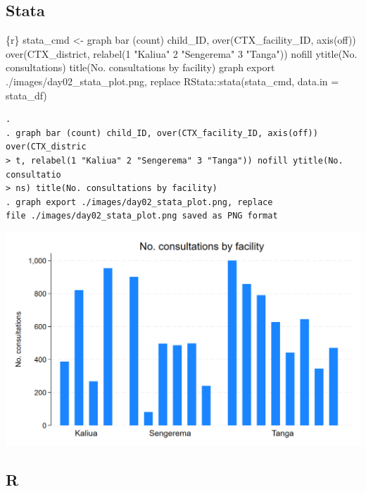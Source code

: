 \documentclass[
  letterpaper,
  DIV=11,
  numbers=noendperiod,
  oneside]{scrreprt}
\newenvironment{Shaded}{\begin{snugshade}}{\end{snugshade}}
\newcommand{\AttributeTok}[1]{\textcolor[rgb]{0.40,0.45,0.13}{#1}}
\newcommand{\FunctionTok}[1]{\textcolor[rgb]{0.28,0.35,0.67}{#1}}
\newcommand{\InformationTok}[1]{\textcolor[rgb]{0.37,0.37,0.37}{#1}}
\newcommand{\NormalTok}[1]{\textcolor[rgb]{0.00,0.23,0.31}{#1}}
\newcommand{\OtherTok}[1]{\textcolor[rgb]{0.00,0.23,0.31}{#1}}
\newcommand{\SpecialCharTok}[1]{\textcolor[rgb]{0.37,0.37,0.37}{#1}}
\newcommand{\StringTok}[1]{\textcolor[rgb]{0.13,0.47,0.30}{#1}}
\begin{document}
\subsection{Stata}

\begin{Shaded}
\begin{Highlighting}[]
\InformationTok{\textasciigrave{}\textasciigrave{}\textasciigrave{}\{r\}}
\NormalTok{stata\_cmd }\OtherTok{\textless{}{-}} \StringTok{\textquotesingle{}}
\StringTok{graph bar (count) child\_ID, over(CTX\_facility\_ID, axis(off)) over(CTX\_district, relabel(1 "Kaliua" 2 "Sengerema" 3 "Tanga")) nofill ytitle(No. consultations) title(No. consultations by facility)}
\StringTok{graph export ./images/day02\_stata\_plot.png, replace}
\StringTok{\textquotesingle{}}
\NormalTok{RStata}\SpecialCharTok{::}\FunctionTok{stata}\NormalTok{(stata\_cmd,}
              \AttributeTok{data.in =}\NormalTok{ stata\_df)}
\InformationTok{\textasciigrave{}\textasciigrave{}\textasciigrave{}}
\end{Highlighting}
\end{Shaded}

\begin{verbatim}
. 
. graph bar (count) child_ID, over(CTX_facility_ID, axis(off)) over(CTX_distric
> t, relabel(1 "Kaliua" 2 "Sengerema" 3 "Tanga")) nofill ytitle(No. consultatio
> ns) title(No. consultations by facility)
. graph export ./images/day02_stata_plot.png, replace
file ./images/day02_stata_plot.png saved as PNG format
\end{verbatim}

\includegraphics{images/day02_stata_plot.png}

\subsection{R}
\end{document}
